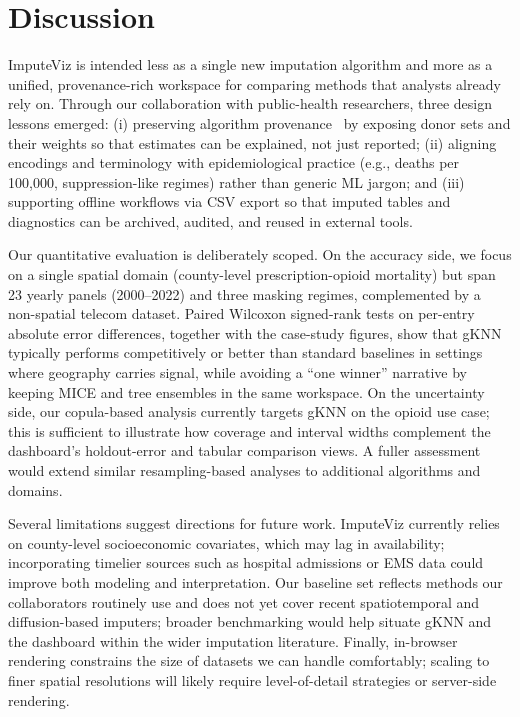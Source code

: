 \documentclass[review]{vgtc}
\newcommand{\tool}{ImputeViz\xspace}
\begin{document}
\section{Discussion}
\label{sec:discussion}

\tool is intended less as a single new imputation algorithm and more as a unified, provenance-rich workspace for comparing methods that analysts already rely on. Through our collaboration with public-health researchers, three design lessons emerged: (i) preserving algorithm provenance~\cite{Ragan2016} by exposing donor sets and their weights so that estimates can be explained, not just reported; (ii) aligning encodings and terminology with epidemiological practice (e.g., deaths per 100{,}000, suppression-like regimes) rather than generic ML jargon; and (iii) supporting offline workflows via CSV export so that imputed tables and diagnostics can be archived, audited, and reused in external tools.

Our quantitative evaluation is deliberately scoped. On the accuracy side, we focus on a single spatial domain (county-level prescription-opioid mortality) but span 23 yearly panels (2000--2022) and three masking regimes, complemented by a non-spatial telecom dataset. Paired Wilcoxon signed-rank tests on per-entry absolute error differences, together with the case-study figures, show that gKNN typically performs competitively or better than standard baselines in settings where geography carries signal, while avoiding a ``one winner'' narrative by keeping MICE and tree ensembles in the same workspace. On the uncertainty side, our copula-based analysis currently targets gKNN on the opioid use case; this is sufficient to illustrate how coverage and interval widths complement the dashboard's holdout-error and tabular comparison views. A fuller assessment would extend similar resampling-based analyses to additional algorithms and domains.

Several limitations suggest directions for future work. \tool currently relies on county-level socioeconomic covariates, which may lag in availability; incorporating timelier sources such as hospital admissions or EMS data could improve both modeling and interpretation. Our baseline set reflects methods our collaborators routinely use and does not yet cover recent spatiotemporal and diffusion-based imputers; broader benchmarking would help situate gKNN and the dashboard within the wider imputation literature. Finally, in-browser rendering constrains the size of datasets we can handle comfortably; scaling to finer spatial resolutions will likely require level-of-detail strategies or server-side rendering.
\end{document}
